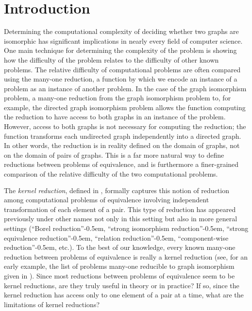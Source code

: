 \section{Introduction}

Determining the computational complexity of deciding whether two graphs are isomorphic has significant implications in nearly every field of computer science.
One main technique for determining the complexity of the problem is showing how the difficulty of the problem relates to the difficulty of other known problems.
The relative difficulty of computational problems are often compared using the many-one reduction, a function by which we encode an instance of a problem as an instance of another problem.
In the case of the graph isomorphism problem, a many-one reduction from the graph isomorphism problem to, for example, the directed graph isomorphism problem allows the function computing the reduction to have access to both graphs in an instance of the problem.
However, access to both graphs is not necessary for computing the reduction; the function transforms each undirected graph independently into a directed graph.
In other words, the reduction is in reality defined on the domain of graphs, not on the domain of pairs of graphs.
This is a far more natural way to define reductions between problems of equivalence, and is furthermore a finer-grained comparison of the relative difficulty of the two computational problems.

The \emph{kernel reduction}, defined in \autocite[Definition~4.13]{fg11}, formally captures this notion of reduction among computational problems of equivalence involving independent transformation of each element of a pair.
This type of reduction has appeared previously under other names not only in this setting but also in more general settings (``Borel reduction''\kern-0.5em, ``strong isomorphism reduction''\kern-0.5em, ``strong equivalence reduction''\kern-0.5em, ``relation reduction''\kern-0.5em, ``component-wise reduction''\kern-0.5em, etc.).
To the best of our knowledge, every known many-one reduction between problems of equivalence is really a kernel reduction (see, for an early example, the list of problems many-one reducible to graph isomorphism given in \autocite{bc79}).
Since most reductions between problems of equivalence seem to be kernel reductions, are they truly useful in theory or in practice?
If so, since the kernel reduction has access only to one element of a pair at a time, what are the limitations of kernel reductions?

